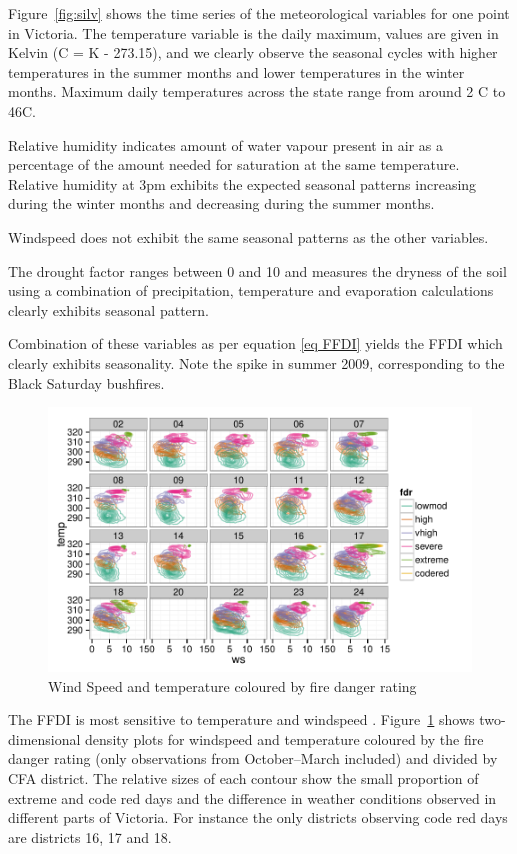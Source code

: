 \documentclass[11pt,a4paper]{article}
\begin{document}
Figure~\ref{fig:silv} shows the time series of the meteorological variables for one point in Victoria. The temperature variable is the daily maximum, values are given in Kelvin (\degree C = K - 273.15), and we clearly observe the seasonal cycles with higher temperatures in the summer months and lower temperatures in the winter months. Maximum daily temperatures across the state range from around 2 \degree C to 46\degree  C.

Relative humidity indicates amount of water vapour present in air as a percentage of the amount needed for saturation at the same temperature. Relative humidity at 3pm exhibits the expected seasonal patterns increasing during the winter months and decreasing during the summer months.

Windspeed does not exhibit the same seasonal patterns as the other variables.

The drought factor ranges between 0 and 10 and measures the dryness of the soil using a combination of precipitation, temperature and evaporation calculations \citep{keetch68} clearly exhibits seasonal pattern.

Combination of these variables as per equation \eqref{eq FFDI} yields the FFDI which clearly exhibits seasonality. Note the spike in summer 2009, corresponding to the Black Saturday bushfires.

\begin{figure}
  \centering
	\includegraphics[width=1\columnwidth]{figures/tw_fdr.pdf}
  \caption{Wind Speed and temperature coloured by fire danger rating}
  \label{fig:tw_fdr}
\end{figure}

The FFDI is most sensitive to temperature and windspeed \citep{dowdy10}. Figure~\ref{fig:tw_fdr} shows two-dimensional density plots for windspeed and temperature coloured by the fire danger rating (only observations from October--March included) and divided by CFA district. The relative sizes of each contour show the small proportion of extreme and code red days and the difference in weather conditions observed in different parts of Victoria. For instance the only districts observing code red days are districts 16, 17 and 18.
\end{document}
